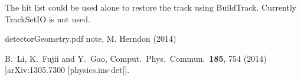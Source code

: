 \documentclass[aps,prd,superscriptaddress,floatfix]{revtex4}
\begin{document}
The hit list could be used alone to restore the track using BuildTrack.  Currently TrackSetIO is not used.

\begin{thebibliography}{99}

detectorGeometry.pdf note, M. Herndon (2014)

  B.~Li, K.~Fujii and Y.~Gao,
  Comput.\ Phys.\ Commun.\  {\bf 185}, 754 (2014)
  [arXiv:1305.7300 [physics.ins-det]].


\end{thebibliography}
% 
\end{document}
